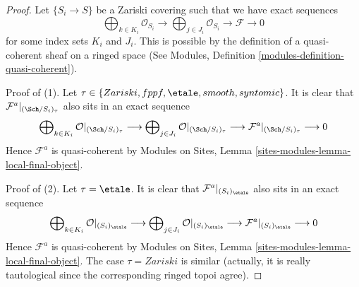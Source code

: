 \begin{proof}
Let $\{S_i \to S\}$ be a Zariski covering such that we have exact sequences
$$
\bigoplus\nolimits_{k \in K_i} \mathcal{O}_{S_i} \longrightarrow
\bigoplus\nolimits_{j \in J_i} \mathcal{O}_{S_i} \longrightarrow
\mathcal{F} \longrightarrow 0
$$
for some index sets $K_i$ and $J_i$. This is possible by the definition
of a quasi-coherent sheaf on a ringed space
(See Modules, Definition \ref{modules-definition-quasi-coherent}).

\medskip\noindent
Proof of (1). Let $\tau \in \{Zariski, \linebreak[0] fppf, \linebreak[0]
\etale, \linebreak[0] smooth, \linebreak[0] syntomic\}$.
It is clear that $\mathcal{F}^a|_{(\Sch/S_i)_\tau}$ also
sits in an exact sequence
$$
\bigoplus\nolimits_{k \in K_i} \mathcal{O}|_{(\Sch/S_i)_\tau}
\longrightarrow
\bigoplus\nolimits_{j \in J_i} \mathcal{O}|_{(\Sch/S_i)_\tau}
\longrightarrow
\mathcal{F}^a|_{(\Sch/S_i)_\tau} \longrightarrow 0
$$
Hence $\mathcal{F}^a$ is quasi-coherent by Modules on Sites,
Lemma \ref{sites-modules-lemma-local-final-object}.

\medskip\noindent
Proof of (2). Let $\tau = \etale$.
It is clear that $\mathcal{F}^a|_{(S_i)_\etale}$ also sits
in an exact sequence
$$
\bigoplus\nolimits_{k \in K_i} \mathcal{O}|_{(S_i)_\etale}
\longrightarrow
\bigoplus\nolimits_{j \in J_i} \mathcal{O}|_{(S_i)_\etale}
\longrightarrow
\mathcal{F}^a|_{(S_i)_\etale} \longrightarrow 0
$$
Hence $\mathcal{F}^a$ is quasi-coherent by Modules on Sites,
Lemma \ref{sites-modules-lemma-local-final-object}.
The case $\tau = Zariski$ is similar (actually, it is really
tautological since the corresponding ringed topoi agree).
\end{proof}

